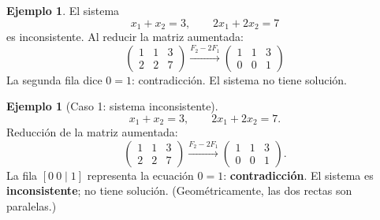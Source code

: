 \documentclass[11pt,letterpaper]{article}
\theoremstyle{definition}
\newtheorem{ejemplo}[definicion]{Ejemplo}
\theoremstyle{plain}
\begin{document}
\begin{ejemplo}
El sistema
\[
  x_1 + x_2 = 3, \qquad 2x_1 + 2x_2 = 7
\]
es inconsistente. Al reducir la matriz aumentada:
\[
  \left(\begin{array}{cc|c}1&1&3\\2&2&7\end{array}\right)
  \xrightarrow{F_2-2F_1}
  \left(\begin{array}{cc|c}1&1&3\\0&0&1\end{array}\right)
\]
La segunda fila dice $0=1$: contradicción. El sistema no tiene solución.
\end{ejemplo}

\begin{ejemplo}[Caso 1: sistema inconsistente]
\[
  x_1 + x_2 = 3, \qquad 2x_1 + 2x_2 = 7.
\]
Reducción de la matriz aumentada:
\[
  \left(\begin{array}{cc|c}1&1&3\\2&2&7\end{array}\right)
  \xrightarrow{F_2 - 2F_1}
  \left(\begin{array}{cc|c}1&1&3\\0&0&1\end{array}\right).
\]
La fila $[0\ 0\mid 1]$ representa la ecuación $0=1$: \textbf{contradicción}. El sistema es
\textbf{inconsistente}; no tiene solución. (Geométricamente, las dos rectas son paralelas.)
\end{ejemplo}
\end{document}
